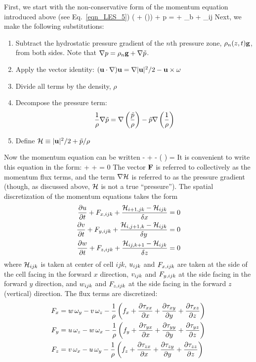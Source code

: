 First, we start with the non-conservative form of the momentum equation introduced above (see Eq.~\ref{eqn_LES_5})
\be \rho \left(  + (\bu \cdot \nabla)\bu  \right) + \nabla p = \rho \bg + \bof_b + \nabla\!\cdot \btau_{ij}  \label{momentum} \ee
Next, we make the following substitutions:
\begin{enumerate}
\item Subtract the hydrostatic pressure gradient of the $n$th pressure zone, $\rho_n(z,t) {\mathbf{g}}$, from both sides. Note that
$\nabla p=\rho_n {\mathbf{g}} + \nabla \tilde{p}$.
\item Apply the vector identity: $({\mathbf{u}} \cdot \nabla) {\mathbf{u}} = \nabla|{\mathbf{u}}|^2/2 - {\mathbf{u}}\times{\mathbf{\omega}} $
\item Divide all terms by the density, $\rho$
\item Decompose the pressure term:
   \[ \frac{1}{\rho} \nabla \tilde{p} = \nabla \left( \frac{\tilde{p}}{\rho}\right) - \tilde{p} \nabla \left(\frac{1}{\rho} \right)  \]
\item Define $\mathcal{H} \equiv |{\mathbf{u}}|^2/2 + \tilde{p}/\rho $
\end{enumerate}
Now the momentum equation can be written
\be {} - \bu\times\bo + \nabla \calH - \tp \nabla \left( \right) =    \label{momeq} \ee
It is convenient to write this equation in the form:
\be {} + \bF + \nabla \cH = 0 \label{simple_momentum_equation} \ee
The vector ${\mathbf{F}}$ is referred to collectively as the momentum flux terms, and the term $\nabla \mathcal{H}$ is referred to as the
pressure gradient (though, as discussed above, $\mathcal{H}$ is not a true ``pressure''). The spatial discretization of the momentum equations takes the form
\begin{align}
\frac{\partial u}{\partial t} + F_{x,ijk} + \frac{\mathcal{H}_{i+1,jk} -\mathcal{H}_{ijk}}{\delta x} &= 0  \label{umom} \\
\frac{\partial v}{\partial t} + F_{y,ijk} + \frac{\mathcal{H}_{i,j+1,k}-\mathcal{H}_{ijk}}{\delta y} &= 0  \label{vmom} \\
\frac{\partial w}{\partial t} + F_{z,ijk} + \frac{\mathcal{H}_{ij,k+1} -\mathcal{H}_{ijk}}{\delta z} &= 0  \label{wmom}
\end{align}
where $\mathcal{H}_{ijk}$ is taken at center of cell $ijk$,
$u_{ijk}$ and $F_{x,ijk}$ are taken at the side of the cell facing
in the forward $x$ direction, $v_{ijk}$ and $F_{y,ijk}$ at the side
facing in the forward $y$ direction, and $w_{ijk}$ and $F_{z,ijk}$
at the side facing in the forward $z$ (vertical) direction.
The flux terms are discretized:
\begin{align}
F_x &= w \, \omega_y - v \, \omega_z - \frac{1}{\rho} \left( f_x
  +  \frac{\partial \tau_{xx}}{\partial x} + \frac{\partial \tau_{xy}}{\partial y} + \frac{\partial \tau_{xz}}{\partial z} \right) \\
F_y &= u \, \omega_z - w \, \omega_x - \frac{1}{\rho} \left( f_y
  +  \frac{\partial \tau_{yx}}{\partial x} + \frac{\partial \tau_{yy}}{\partial y} + \frac{\partial \tau_{yz}}{\partial z} \right) \\
F_z &= v \, \omega_x - u \, \omega_y - \frac{1}{\rho} \left( f_z
  +  \frac{\partial \tau_{zx}}{\partial x} + \frac{\partial \tau_{zy}}{\partial y} + \frac{\partial \tau_{zz}}{\partial z} \right)
\end{align}
